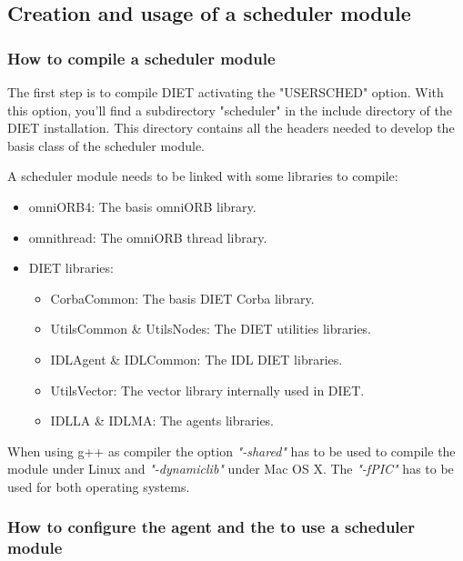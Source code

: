 \subsection{Creation and usage of a scheduler module}
\subsubsection{How to compile a scheduler module}
The first step is to compile DIET activating the "USERSCHED" option.
With this option, you'll find a subdirectory "scheduler" in the include
directory of the DIET installation. This directory contains all the headers
needed to develop the basis class of the scheduler module.

A scheduler module needs to be linked with some libraries to compile:
\begin{itemize}
  \item omniORB4: The basis omniORB library.
  \item omnithread: The omniORB thread library.
  \item DIET libraries:
    \begin{itemize}
      \item CorbaCommon: The basis DIET Corba library.
      \item UtilsCommon \& UtilsNodes: The DIET utilities libraries.
      \item IDLAgent \& IDLCommon: The IDL DIET libraries.
      \item UtilsVector: The vector library internally used in DIET.
      \item IDLLA \& IDLMA: The agents libraries.
    \end{itemize}
\end{itemize}
When using g++ as compiler the option \textit{"-shared"} has to be used to
compile the module under Linux and \textit{"-dynamiclib"} under Mac OS X.
The \textit{"-fPIC"} has to be used for both operating systems.

\subsubsection{How to configure the agent and the {\sed} to use a
  scheduler module}

